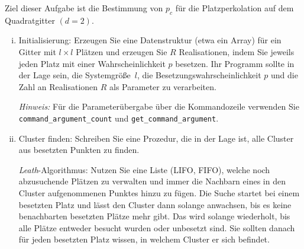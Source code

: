 \begin{question}[subtitle=Perkolationschwelle]
  Ziel dieser Aufgabe ist die Bestimmung von $p_c$ für die Platzperkolation auf dem Quadratgitter $(d = 2)$.
  \begin{enumerate}[(i)]
  \item Initialisierung: Erzeugen Sie eine Datenstruktur (etwa ein Array) für ein Gitter mit $l \times l$ Plätzen und erzeugen Sie $R$ Realisationen, indem Sie jeweils jeden Platz mit einer Wahrscheinlichkeit $p$ besetzen.
    Ihr Programm sollte in der Lage sein, die Systemgröße~$l$, die Besetzungswahrscheinlichkeit $p$ und die Zahl an Realisationen $R$ als Parameter zu verarbeiten.

    \begin{sloppypar}
      \textit{Hinweis:} Für die Parameterübergabe über die Kommandozeile verwenden Sie \texttt{command_argument_count} und \texttt{get_command_argument}.
    \end{sloppypar}
  \item Cluster finden: Schreiben Sie eine Prozedur, die in der Lage ist, alle Cluster aus besetzten Punkten zu finden.

    \textit{Leath}-Algorithmus: Nutzen Sie eine Liste (LIFO, FIFO), welche noch abzusuchende Plätzen zu verwalten und immer die Nachbarn eines in den Cluster aufgenommenen Punktes hinzu zu fügen.
    Die Suche startet bei einem besetzten Platz und lässt den Cluster dann solange anwachsen, bis es keine benachbarten besetzten Plätze mehr gibt.
    Das wird solange wiederholt, bis alle Plätze entweder besucht wurden oder unbesetzt sind.
    Sie sollten danach für jeden besetzten Platz wissen, in welchem Cluster er sich befindet.


\end{enumerate}
\end{question}
